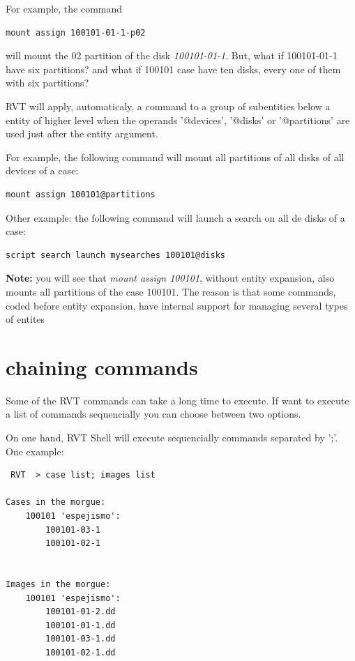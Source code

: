 \documentclass[a4paper,11pt,oneside]{report}
\begin{document}
For example, the command 

\begin{verbatim}
mount assign 100101-01-1-p02
\end{verbatim}

 will mount the 02 partition of the disk \emph{100101-01-1}.  But, what if 100101-01-1 have six partitions? and what if 100101 case have ten disks, every one of them with six partitions?

RVT will apply, automaticaly, a command to a group of subentities below a entity of higher level when the operands '@devices', '@disks' or '@partitions' are used just after the entity argument.

For example, the following command will mount all partitions of all disks of all devices of a case:

\begin{verbatim}
mount assign 100101@partitions
\end{verbatim}

Other example: the following command will launch a search on all de disks of a case:

\begin{verbatim}
script search launch mysearches 100101@disks
\end{verbatim}


\textbf{Note:} you will see that \emph{mount assign 100101}, without entity expansion, also mounts all partitions of the case 100101. The reason is that some commands, coded before entity expansion, have internal support for managing several types of entites


\section{chaining commands}

Some of the RVT commands can take a long time to execute. If want to execute a list of commands sequencially you can choose between two options.

On one hand, RVT Shell will execute sequencially commands separated by ';'. One example:

\begin{verbatim}
 RVT  > case list; images list

Cases in the morgue: 
	100101 'espejismo':
		100101-03-1
		100101-02-1


Images in the morgue: 
	100101 'espejismo':
		100101-01-2.dd
		100101-01-1.dd
		100101-03-1.dd
		100101-02-1.dd
\end{verbatim}
\end{document}
